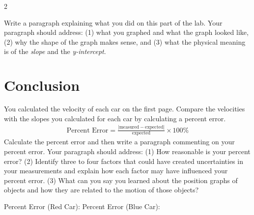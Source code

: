 \documentclass[10pt]{exam}
\begin{document}
\begin{Sbox}
\begin{minipage}{6.3in}
\begin{multicols}{2}

\end{multicols}
\end{minipage}\end{Sbox}

\noindent
\shadowbox{\TheSbox}

\pagebreak
\noindent
Write a paragraph explaining what you did on this part of the lab.  Your paragraph should address: (1) what you graphed and what the graph looked like, (2) why the shape of the graph makes sense, and (3) what the physical meaning is of the \emph{slope} and the \emph{y-intercept}.

\pagebreak

\section*{Conclusion}

You calculated the velocity of each car on the first page.  Compare the velocities with the slopes you calculated for each car by calculating a percent error.
%
\begin{align*}
  \text{Percent Error} = \frac{\left| \text{measured} - \text{expected}  \right|}{\text{expected}} \times 100\%
\end{align*}
%
Calculate the percent error and then write a paragraph commenting on your percent error.  Your paragraph should address: (1) How reasonable is your percent error? (2) Identify three to four factors that could have created uncertainties in your measurements and explain how each factor may have influenced your percent error. (3) What can you say you learned about the position graphs of objects and how they are related to the motion of those objects?


\vspace{1em}

Percent Error (Red Car): \fillin[][10em]
%
\hfill
%
Percent Error (Blue Car): \fillin[][10em]
\end{document}
